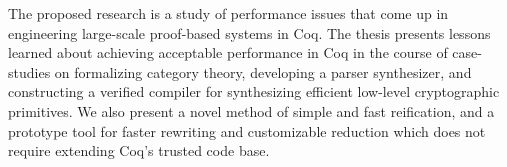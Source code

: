 The proposed research is a study of performance issues that come up in engineering large-scale proof-based systems in Coq.
The thesis presents lessons learned about achieving acceptable performance in Coq in the course of case-studies on formalizing category theory, developing a parser synthesizer, and constructing a verified compiler for synthesizing efficient low-level cryptographic primitives.
We also present a novel method of simple and fast reification, and a prototype tool for faster rewriting and customizable reduction which does not require extending Coq's trusted code base.
